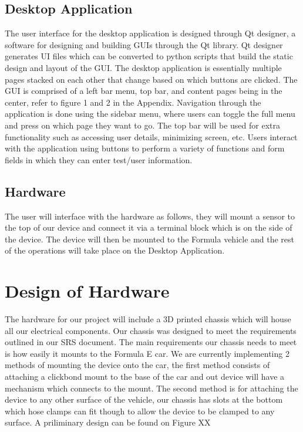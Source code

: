 \documentclass[12pt, titlepage]{article}
\begin{document}
\subsection{Desktop Application}
The user interface for the desktop application is designed through Qt designer, a software for designing and building GUIs through the Qt library. Qt designer generates UI files which can be converted to python scripts that build the static design and layout of the GUI. The desktop application is essentially multiple pages stacked on each other that change based on which buttons are clicked. The GUI is comprised of a left bar menu, top bar, and content pages being in the center, refer to figure 1 and 2 in the Appendix. Navigation through the application is done using the sidebar menu, where users can toggle the full menu and press on which page they want to go. The top bar will be used for extra functionality such as accessing user details, minimizing screen, etc. Users interact with the application using buttons to perform a variety of functions and form fields in which they can enter test/user information.

\subsection{Hardware}
The user will interface with the hardware as follows, they will mount a sensor to the top of our device and connect it via a terminal block which is on the side of the device. The device will then be mounted to the Formula vehicle and the rest of the operations will take place on the Desktop Application.


\section{Design of Hardware}

The hardware for our project will include a 3D printed chassis which will house all our electrical components. Our chassis was designed to meet the requirements outlined in our SRS document. The main requirements our chassis needs to meet is how easily it mounts to the Formula E car. We are currently implementing 2 methods of mounting the device onto the car, the first method consists of attaching a clickbond mount to the base of the car and out device will have a mechanism which connects to the mount. The second method is for attaching the device to any other surface of the vehicle, our chassis has slots at the bottom which hose clamps can fit though to allow the device to be clamped to any surface. A priliminary design can be found on Figure XX
\end{document}
